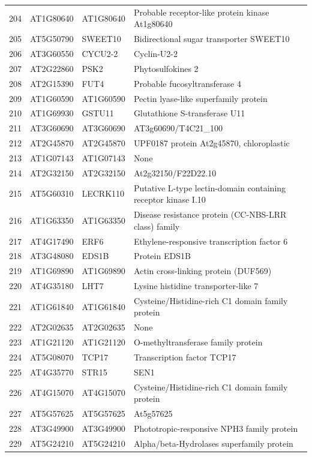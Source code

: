 \documentclass[11pt]{article}
\begin{document}
\begin{center}
\begin{tabular}{rlll}
204 & AT1G80640 & AT1G80640 & Probable receptor-like protein kinase At1g80640\\
205 & AT5G50790 & SWEET10 & Bidirectional sugar transporter SWEET10\\
206 & AT3G60550 & CYCU2-2 & Cyclin-U2-2\\
207 & AT2G22860 & PSK2 & Phytosulfokines 2\\
208 & AT2G15390 & FUT4 & Probable fucosyltransferase 4\\
209 & AT1G60590 & AT1G60590 & Pectin lyase-like superfamily protein\\
210 & AT1G69930 & GSTU11 & Glutathione S-transferase U11\\
211 & AT3G60690 & AT3G60690 & AT3g60690/T4C21\_100\\
212 & AT2G45870 & AT2G45870 & UPF0187 protein At2g45870, chloroplastic\\
213 & AT1G07143 & AT1G07143 & None\\
214 & AT2G32150 & AT2G32150 & At2g32150/F22D22.10\\
215 & AT5G60310 & LECRK110 & Putative L-type lectin-domain containing receptor kinase I.10\\
216 & AT1G63350 & AT1G63350 & Disease resistance protein (CC-NBS-LRR class) family\\
217 & AT4G17490 & ERF6 & Ethylene-responsive transcription factor 6\\
218 & AT3G48080 & EDS1B & Protein EDS1B\\
219 & AT1G69890 & AT1G69890 & Actin cross-linking protein (DUF569)\\
220 & AT4G35180 & LHT7 & Lysine histidine transporter-like 7\\
221 & AT1G61840 & AT1G61840 & Cysteine/Histidine-rich C1 domain family protein\\
222 & AT2G02635 & AT2G02635 & None\\
223 & AT1G21120 & AT1G21120 & O-methyltransferase family protein\\
224 & AT5G08070 & TCP17 & Transcription factor TCP17\\
225 & AT4G35770 & STR15 & SEN1\\
226 & AT4G15070 & AT4G15070 & Cysteine/Histidine-rich C1 domain family protein\\
227 & AT5G57625 & AT5G57625 & At5g57625\\
228 & AT3G49900 & AT3G49900 & Phototropic-responsive NPH3 family protein\\
229 & AT5G24210 & AT5G24210 & Alpha/beta-Hydrolases superfamily protein\\

\end{tabular}
\end{center}
\end{document}
